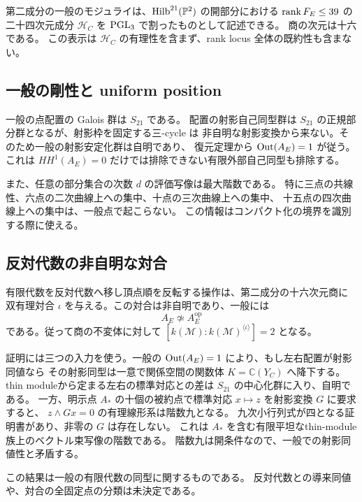 第二成分の一般のモジュライは、$\operatorname{Hilb}^{21}(\mathbb P^2)$ の開部分における
$\operatorname{rank} F_E\le39$ の二十四次元成分 $\mathcal H_C$ を $\operatorname{PGL}_3$ で割ったものとして記述できる。
商の次元は十六である。
この表示は $\mathcal H_C$ の有理性を含まず、rank locus 全体の既約性も含まない。

\subsection{一般の剛性と uniform position}
一般の点配置の Galois 群は $S_{21}$ である。
配置の射影自己同型群は $S_{21}$ の正規部分群となるが、射影枠を固定する三-cycle は
非自明な射影変換から来ない。そのため一般の射影安定化群は自明であり、
復元定理から $\operatorname{Out}(A_E)=1$ が従う。
これは $HH^1(A_E)=0$ だけでは排除できない有限外部自己同型も排除する。

また、任意の部分集合の次数 $d$ の評価写像は最大階数である。
特に三点の共線性、六点の二次曲線上への集中、十点の三次曲線上への集中、
十五点の四次曲線上への集中は、一般点で起こらない。
この情報はコンパクト化の境界を識別する際に使える。

\subsection{反対代数の非自明な対合}
有限代数を反対代数へ移し頂点順を反転する操作は、第二成分の十六次元商に
双有理対合 $\iota$ を与える。この対合は非自明であり、一般には
\[
 A_E\not\simeq A_E^{\mathrm{op}}
\]
である。従って商の不変体に対して
$[k(\mathcal M):k(\mathcal M)^{\langle\iota\rangle}]=2$ となる。

証明には三つの入力を使う。一般の $\operatorname{Out}(A_E)=1$ により、もし左右配置が射影同値なら
その射影同型は一意で関係空間の関数体 $K=\mathbb C(Y_C)$ へ降下する。
thin moduleから定まる左右の標準対応との差は $S_{21}$ の中心化群に入り、自明である。
一方、明示点 $A_*$ の十個の被約点で標準対応 $x\mapsto z$ を射影変換 $G$ に要求すると、
$z\wedge Gx=0$ の有理線形系は階数九となる。
九次小行列式が四となる証明書があり、非零の $G$ は存在しない。
これは $A_*$ を含む有限平坦なthin-module族上のベクトル束写像の階数である。
階数九は開条件なので、一般での射影同値性と矛盾する。

この結果は一般の有限代数の同型に関するものである。
反対代数との導来同値や、対合の全固定点の分類は未決定である。

